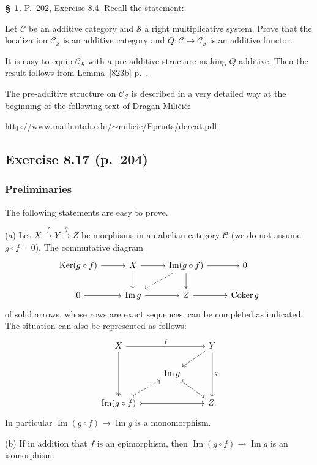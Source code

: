 \documentclass[12pt]{article}
\theoremstyle{remark}
\theoremstyle{definition}
\newtheorem{s}[thm]{\S}
\newcommand{\nn}{\noindent}
\newcommand{\cc}{\mathcal}
\newcommand{\C}{\mathcal C}
\newcommand{\xr}{\xrightarrow}
\DeclareMathOperator{\Coker}{Coker}
\DeclareMathOperator{\Ima}{Im}
\DeclareMathOperator{\Ker}{Ker}
\begin{document}
%
%
\begin{s} 
P.~202, Exercise 8.4. Recall the statement: 

Let $\C$ be an additive category and $\cc S$ a right multiplicative system. Prove that the localization $\C_{\cc S}$ is an additive category and $Q:\C\to\C_{\cc S}$ is an additive functor. 

It is easy to equip $\C_{\cc S}$ with a pre-additive structure making $Q$ additive. Then the result follows from Lemma~\ref{823b} p.~\pageref{823b}. 

The pre-additive structure on $\C_{\cc S}$ is described in a very detailed way at the beginning of the following text of Dragan Mili\v{c}i\'c:%
%
\begin{center}\href{http://www.math.utah.edu/~milicic/Eprints/dercat.pdf}{http://www.math.utah.edu/$\sim$milicic/Eprints/dercat.pdf}
\end{center}
\end{s}
%
%
\subsection{Exercise 8.17 (p.~204)}\label{817} 
%
\subsubsection{Preliminaries}\label{preli}
%
The following statements are easy to prove.

\nn(a) Let $X\xr fY\xr gZ$ be morphisms in an abelian category $\C$ (we do not assume $g\circ f=0$). The commutative diagram 
$$
\begin{tikzcd}
\Ker(g\circ f)\ar{r}&X\ar{d}\ar{r}&\Ima(g\circ f)\ar[dashed]{dl}\ar{d}\ar{r}&0\\ 
0\ar{r}&\Ima g\ar{r}&Z\ar{r}&\Coker g
\end{tikzcd}
$$ 
of solid arrows, whose rows are exact sequences, can be completed as indicated. The situation can also be represented as follows: 
$$
\begin{tikzcd}
X\ar[two heads]{dd}\ar{rr}{f}&&Y\ar[two heads]{dl}\ar{dd}{g}\\ 
{}&\Ima g\ar[tail]{dr}\\ 
\Ima(g\circ f)\ar[dashed,tail]{ur}\ar[tail]{rr}&&Z.
\end{tikzcd}
$$ 
In particular $\Ima(g\circ f)\to\Ima g$ is a monomorphism.

\nn(b) If in addition that $f$ is an epimorphism, then $\Ima(g\circ f)\to\Ima g$ is an isomorphism. 
\end{document}
